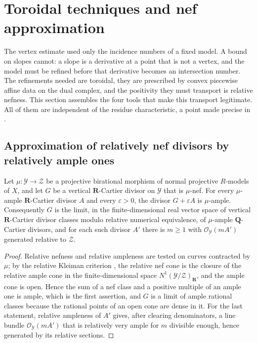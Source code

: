 \section{Toroidal techniques and nef approximation}
\label{sec:ch22-toroidal}

The vertex estimate used only the incidence numbers of a fixed model.  A
bound on slopes cannot: a slope is a derivative at a point that is not a
vertex, and the model must be refined before that derivative becomes an
intersection number.  The refinements needed are toroidal, they are
prescribed by convex piecewise affine data on the dual complex, and the
positivity they must transport is relative nefness.  This section assembles
the four tools that make this transport legitimate.  All of them are
independent of the residue characteristic, a point made precise in
.

\subsection{Approximation of relatively nef divisors by relatively ample ones}

\begin{lemma}
\label{lem:ch22-nef-approximation}
Let \(\mu:\mathcal Y\to\mathcal Z\) be a projective birational morphism of
normal projective \(R\)-models of \(X\), and let \(G\) be a vertical
\(\mathbf R\)-Cartier divisor on \(\mathcal Y\) that is \(\mu\)-nef.  For
every \(\mu\)-ample \(\mathbf R\)-Cartier divisor \(A\) and every
\(\varepsilon>0\), the divisor \(G+\varepsilon A\) is \(\mu\)-ample.
Consequently \(G\) is the limit, in the finite-dimensional real vector space
of vertical \(\mathbf R\)-Cartier divisor classes modulo relative numerical
equivalence, of \(\mu\)-ample \(\mathbf Q\)-Cartier divisors, and for each
such divisor \(A'\) there is \(m\geq1\) with
\(\mathcal O_{\mathcal Y}(mA')\) generated relative to \(\mathcal Z\).
\end{lemma}

\begin{proof}
Relative nefness and relative ampleness are tested on curves contracted by
\(\mu\); by the relative Kleiman criterion \cite[Section~1.4]{KM08}, the
relative nef cone is the closure of the relative ample cone in the
finite-dimensional space \(N^1(\mathcal Y/\mathcal Z)_{\mathbf R}\), and the
ample cone is open.  Hence the sum of a nef class and a positive multiple of
an ample one is ample, which is the first assertion, and \(G\) is a limit of
ample rational classes because the rational points of an open cone are dense
in it.  For the last statement, relative ampleness of \(A'\) gives, after
clearing denominators, a line bundle \(\mathcal O_{\mathcal Y}(mA')\) that is
relatively very ample for \(m\) divisible enough, hence generated by its
relative sections.
\end{proof}

